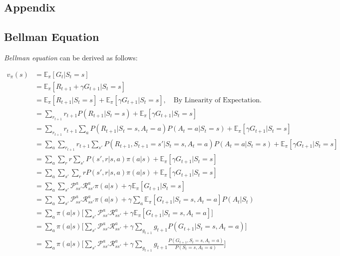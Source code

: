\renewcommand{\thesection}{\Alph{section}.\arabic{section}}
\setcounter{section}{0}

\begin{appendices}
\chapter{Appendix}

\section{Bellman Equation}
\label{appendix:bellman_equation}

\textit{Bellman equation} can be derived as follows:

\begin{align*}
	v_\pi(s) &= \mathbb{E}_{\pi}[G_t|S_t = s]\\ 
	&= \mathbb{E}_{\pi}[R_{t+1}+\gamma G_{t+1}|S_t = s]\\ 
	&= \mathbb{E}_{\pi}[R_{t+1}|S_t = s] + \mathbb{E}_{\pi}[\gamma G_{t+1}|S_t = s], \quad \text{By Linearity of Expectation.}\\
	&= \sum_{r_{t+1}}r_{t+1} P(R_{t+1}|S_t = s) + \mathbb{E}_{\pi}[\gamma G_{t+1}|S_t = s]\\
	&= \sum_{r_{t+1}}r_{t+1} \sum_a P(R_{t+1}|S_t = s, A_t=a)P(A_t=a|S_t=s) + \mathbb{E}_{\pi}[\gamma G_{t+1}|S_t = s]\\
	&=\sum_a \sum_{r_{t+1}}r_{t+1} \sum_{s'}  P(R_{t+1}, S_{t+1}=s'|S_t = s, A_t=a)P(A_t=a|S_t=s) + \mathbb{E}_{\pi}[\gamma G_{t+1}|S_t = s]\\
&=\sum_a \sum_{r}r \sum_{s'} P(s',r|s, a)\pi(a|s) + \mathbb{E}_{\pi}[\gamma G_{t+1}|S_t = s]\\
&=\sum_a \sum_{s'} \sum_{r}r P(s',r|s, a)\pi(a|s) + \mathbb{E}_{\pi}[\gamma G_{t+1}|S_t = s]\\
&=\sum_a \sum_{s'} \mathcal{P}_{ss'}^a\mathcal{R}_{ss'}^a \pi(a|s)+ \gamma \mathbb{E}_{\pi}[ G_{t+1}|S_t = s]\\
&=\sum_a \sum_{s'}\mathcal{P}_{ss'}^a\mathcal{R}_{ss'}^a \pi(a|s) + \gamma \sum_{a}\mathbb{E}_{\pi}[ G_{t+1}|S_t = s, A_{t}=a]P(A_{t}|S_{t})\\
&=\sum_a \pi(a|s) \Bigg[\sum_{s'} \mathcal{P}_{ss'}^a\mathcal{R}_{ss'}^a + \gamma \mathbb{E}_{\pi}[ G_{t+1}|S_t = s, A_{t}=a]\Bigg]\\
&=\sum_a \pi(a|s)\Bigg[\sum_{s'} \mathcal{P}_{ss'}^a\mathcal{R}_{ss'}^a + \gamma \sum_{g_{t+1}}g_{t+1}P( G_{t+1}|S_t = s, A_{t}=a)\Bigg]\\
&=\sum_a \pi(a|s) \Bigg[\sum_{s'} \mathcal{P}_{ss'}^a\mathcal{R}_{ss'}^a + \gamma \sum_{g_{t+1}}g_{t+1}\frac{P( G_{t+1},S_t = s, A_{t}=a)}{P(S_t = s, A_{t}=a)}\Bigg]\\

\end{align*}
\end{appendices}
